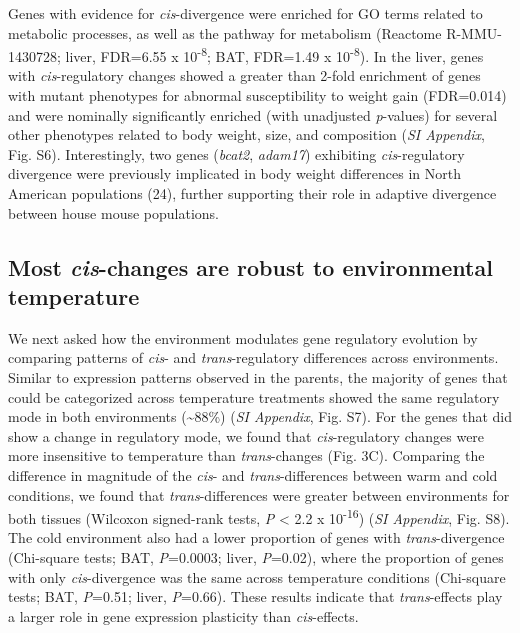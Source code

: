 \documentclass[9pt,twocolumn,twoside,lineno]{pnas-new}
\begin{document}
Genes with evidence for \emph{cis}-divergence were enriched for GO terms
related to metabolic processes, as well as the pathway for metabolism
(Reactome R-MMU-1430728; liver, FDR=6.55 x 10\textsuperscript{-8}; BAT,
FDR=1.49 x 10\textsuperscript{-8}). In the liver, genes with
\emph{cis}-regulatory changes showed a greater than 2-fold enrichment of
genes with mutant phenotypes for abnormal susceptibility to weight gain
(FDR=0.014) and were nominally significantly enriched (with unadjusted
\emph{p}-values) for several other phenotypes related to body weight,
size, and composition (\emph{SI Appendix}, Fig. S6). Interestingly, two
genes (\emph{bcat2}, \emph{adam17}) exhibiting \emph{cis}-regulatory
divergence were previously implicated in body weight differences in
North American populations (24), further supporting their role in
adaptive divergence between house mouse populations.

\hypertarget{most-cis-changes-are-robust-to-environmental-temperature}{%
\subsection*{\texorpdfstring{Most \emph{cis}-changes are robust to
environmental
temperature}{Most cis-changes are robust to environmental temperature}}\label{most-cis-changes-are-robust-to-environmental-temperature}}

We next asked how the environment modulates gene regulatory evolution by
comparing patterns of \emph{cis}- and \emph{trans}-regulatory
differences across environments. Similar to expression patterns observed
in the parents, the majority of genes that could be categorized across
temperature treatments showed the same regulatory mode in both
environments (\textasciitilde88\%) (\emph{SI Appendix}, Fig. S7). For
the genes that did show a change in regulatory mode, we found that
\emph{cis}-regulatory changes were more insensitive to temperature than
\emph{trans}-changes (Fig. 3C). Comparing the difference in magnitude of
the \emph{cis}- and \emph{trans}-differences between warm and cold
conditions, we found that \emph{trans}-differences were greater between
environments for both tissues (Wilcoxon signed-rank tests, \emph{P}
\textless{} 2.2 x 10\textsuperscript{-16}) (\emph{SI Appendix}, Fig.
S8). The cold environment also had a lower proportion of genes with
\emph{trans}-divergence (Chi-square tests; BAT, \emph{P}=0.0003; liver,
\emph{P}=0.02), where the proportion of genes with only
\emph{cis}-divergence was the same across temperature conditions
(Chi-square tests; BAT, \emph{P}=0.51; liver, \emph{P}=0.66). These
results indicate that \emph{trans}-effects play a larger role in gene
expression plasticity than \emph{cis}-effects.
\end{document}
